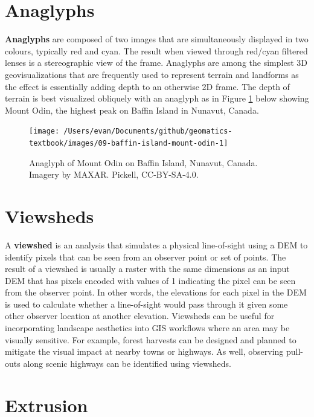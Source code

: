 \documentclass[
]{book}
\begin{document}
\hypertarget{anaglyphs}{%
\section{Anaglyphs}\label{anaglyphs}}

\textbf{Anaglyphs} are composed of two images that are simultaneously displayed in two colours, typically red and cyan. The result when viewed through red/cyan filtered lenses is a stereographic view of the frame. Anaglyphs are among the simplest 3D geovisualizations that are frequently used to represent terrain and landforms as the effect is essentially adding depth to an otherwise 2D frame. The depth of terrain is best visualized obliquely with an anaglyph as in Figure \ref{fig:9-baffin-island-mount-odin-1} below showing Mount Odin, the highest peak on Baffin Island in Nunavut, Canada.

\begin{figure}
\texttt{[image: /Users/evan/Documents/github/geomatics-textbook/images/09-baffin-island-mount-odin-1]} \caption{Anaglyph of Mount Odin on Baffin Island, Nunavut, Canada. Imagery by MAXAR. Pickell, CC-BY-SA-4.0.}\label{fig:9-baffin-island-mount-odin-1}
\end{figure}

\hypertarget{viewsheds}{%
\section{Viewsheds}\label{viewsheds}}

A \textbf{viewshed} is an analysis that simulates a physical line-of-sight using a DEM to identify pixels that can be seen from an observer point or set of points. The result of a viewshed is usually a raster with the same dimensions as an input DEM that has pixels encoded with values of 1 indicating the pixel can be seen from the observer point. In other words, the elevations for each pixel in the DEM is used to calculate whether a line-of-sight would pass through it given some other observer location at another elevation. Viewsheds can be useful for incorporating landscape aesthetics into GIS workflows where an area may be visually sensitive. For example, forest harvests can be designed and planned to mitigate the visual impact at nearby towns or highways. As well, observing pull-outs along scenic highways can be identified using viewsheds.

\hypertarget{extrusion}{%
\section{Extrusion}\label{extrusion}}
\end{document}

